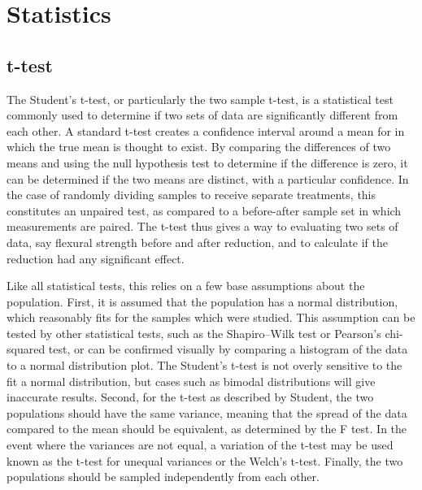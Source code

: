 

\chapter{Statistics}

\section{t-test}
    \label{app:ttest}
    The Student's t-test, or particularly the two sample t-test, is a statistical test commonly used to determine if two sets of data are significantly different from each other.
    A standard t-test creates a confidence interval around a mean for in which the true mean is thought to exist.
    By comparing the differences of two means and using the null hypothesis test to determine if the difference is zero, it can be determined if the two means are distinct, with a particular confidence.
    In the case of randomly dividing samples to receive separate treatments, this constitutes an unpaired test, as compared to a before-after sample set in which measurements are paired.
    The t-test thus gives a way to evaluating two sets of data, say flexural strength before and after reduction, and to calculate if the reduction had any significant effect.

    Like all statistical tests, this relies on a few base assumptions about the population.
    First, it is assumed that the population has a normal distribution, which reasonably fits for the samples which were studied.
    This assumption can be tested by other statistical tests, such as the Shapiro–Wilk test or Pearson's chi-squared test, or can be confirmed visually by comparing a histogram of the data to a normal distribution plot.
    The Student's t-test is not overly sensitive to the fit a normal distribution, but cases such as bimodal distributions will give inaccurate results.
    Second, for the t-test as described by Student, the two populations should have the same variance, meaning that the spread of the data compared to the mean should be equivalent, as determined by the F test.
    In the event where the variances are not equal, a variation of the t-test may be used known as the t-test for unequal variances or the Welch's t-test.
    Finally, the two populations should be sampled independently from each other.

